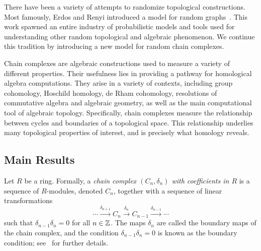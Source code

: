 

There have been a variety of attempts to randomize topological
constructions. Most famously, Erdos and Renyi introduced a model
for random graphs~\cite{erdos_random_1959, erdos_evolution_1960}. 
This work spawned an entire industry of probabilistic
models and tools used for understanding other random topological
and algebraic phenomenon. We continue this tradition by introducing
a new model for random chain complexes.

Chain complexes are algebraic constructions used to measure a variety of 
different properties. Their usefulness lies in providing a pathway
for homological algebra computations. They arise in a variety of contexts,
including group cohomology, Hoschild homology, de Rham cohomology, 
resolutions of commutative algebra and algebraic geometry, as well
as the main computational tool of algebraic topology. Specifically,
chain complexes measure the relationship between cycles and boundaries
of a topological space. This relationship underlies many topological
properties of interest, and is precisely what homology reveals. 

%

\subsection*{Main Results}

Let $R$ be a ring.  Formally, a {\em chain complex $(C_n, \delta_n)$ with coefficients
in $R$} is a
sequence of $R$-modules, denoted $C_n$, together with a sequence of linear
transformations 
\[
  \cdots \xrightarrow{\delta_{n+1}} C_n \xrightarrow{\delta_n}
  C_{n-1} \xrightarrow{\delta_{n-1}} \cdots
\]
such that $\delta_{n-1}\delta_n = 0$ for all $n \in \mathbb{Z}$. The maps $\delta_n$ are called the boundary maps of the chain
complex, and the condition $\delta_{n-1} \delta_n = 0$ is known as the boundary
condition; see~\cite{hatcher2002algebraic} for further details.

